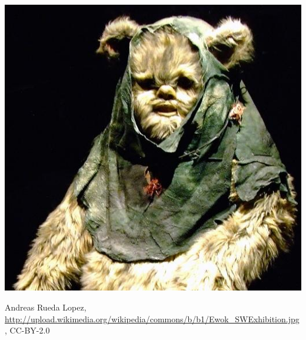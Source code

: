 \begin{minipage}[t]{100mm}
\begin{center}
\includegraphics[width=0.8\linewidth]{Ewok.jpg}

\tiny Andreas Rueda Lopez, \url{http://upload.wikimedia.org/wikipedia/commons/b/b1/Ewok_SWExhibition.jpg}, CC-BY-2.0
\end{center}

\end{minipage}

